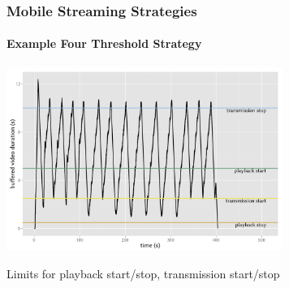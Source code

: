 \documentclass{beamer}
\begin{document}
\begin{frame}
	\frametitle{Mobile Streaming Strategies}
	\framesubtitle{Example Four Threshold Strategy}



		\begin{center}
			\includegraphics[height=6cm]{extras/R-ltesim-plotbuffer-time.png}

			Limits for playback start/stop, transmission start/stop
		\end{center}
		




\end{frame}
\end{document}
